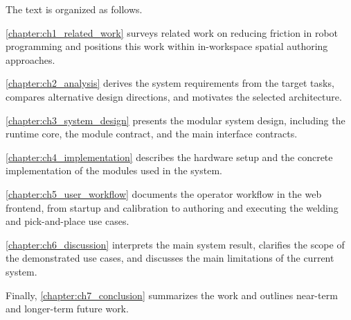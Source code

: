 The text is organized as follows.

\autoref{chapter:ch1_related_work} surveys related work on reducing friction in robot programming and positions this work within in-workspace spatial authoring approaches.

\autoref{chapter:ch2_analysis} derives the system requirements from the target tasks, compares alternative design directions, and motivates the selected architecture.

\autoref{chapter:ch3_system_design} presents the modular system design, including the runtime core, the module contract, and the main interface contracts.

\autoref{chapter:ch4_implementation} describes the hardware setup and the concrete implementation of the modules used in the system.

\autoref{chapter:ch5_user_workflow} documents the operator workflow in the web frontend, from startup and calibration to authoring and executing the welding and pick-and-place use cases.

\autoref{chapter:ch6_discussion} interprets the main system result, clarifies the scope of the demonstrated use cases, and discusses the main limitations of the current system.

Finally, \autoref{chapter:ch7_conclusion} summarizes the work and outlines near-term and longer-term future work.
